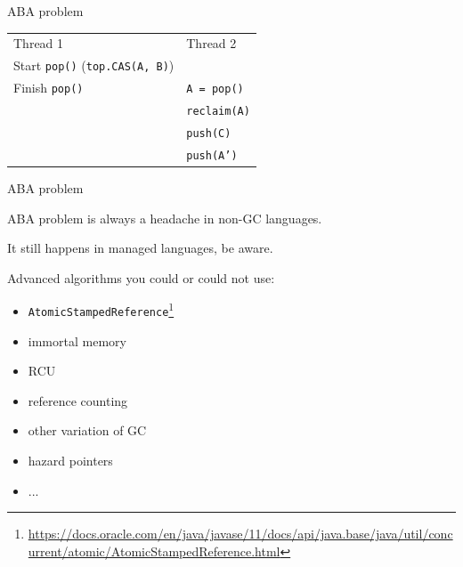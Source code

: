 \begin{frame}{ABA problem}
\begin{center}
\end{center} 

\begin{tabular}{p{5cm}p{5cm}}
Thread 1 & Thread 2 \\
Start \texttt{pop()} (\texttt{top.CAS(A, B)}) & \\
Finish \texttt{pop()} &  \texttt{A = pop()} \\
                     &  \texttt{reclaim(A)} \\
                     &  \texttt{push(C)} \\                     
                     &  \texttt{push(A')} \\                                          
\end{tabular}
\end{frame}



\begin{frame}{ABA problem}

ABA problem is always a headache in non-GC languages. 

It still happens in managed languages, be aware.

Advanced algorithms you could or could not use:
\begin{itemize}
 \item \texttt{AtomicStampedReference}\footnote{\tiny\url{https://docs.oracle.com/en/java/javase/11/docs/api/java.base/java/util/concurrent/atomic/AtomicStampedReference.html}}
 \item immortal memory
 \item RCU
 \item reference counting
 \item other variation of GC
 \item hazard pointers
 \item ...
\end{itemize}

\end{frame}


